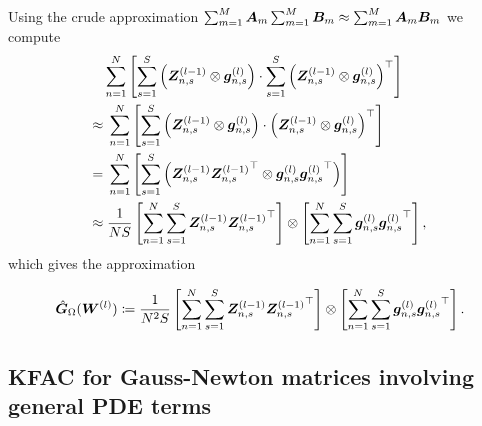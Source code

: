 Using the crude approximation $\sum_{m=1}^M {\bm{A}}_m\sum_{m=1}^M {\bm{B}}_m \approx \sum_{m=1}^M {\bm{A}}_m {\bm{B}}_m$ we compute
\begin{align*}
    & \sum_{n=1}^N
    \left[\sum_{s=1}^S \left( {\bm{Z}}^{(l-1)}_{n,s}\otimes {\bm{g}}_{n,s}^{(l)} \right)
    \cdot
    \sum_{s=1}^S \left( {\bm{Z}}
    ^{(l-1)}_{n,s}\otimes {\bm{g}}_{n,s}^{(l)} \right)^\top\right]
    \\ \approx & \;
    \sum_{n=1}^N
    \left[\sum_{s=1}^S \left( {\bm{Z}}^{(l-1)}_{n,s}\otimes {\bm{g}}_{n,s}^{(l)} \right)
    \cdot
    \left( {\bm{Z}}
    ^{(l-1)}_{n,s}\otimes {\bm{g}}_{n,s}^{(l)} \right)^\top\right]
    \\ = & \;
    \sum_{n=1}^N
    \left[\sum_{s=1}^S \left( {\bm{Z}}^{(l-1)}_{n,s}{{\bm{Z}}
    ^{(l-1)}_{n,s}}^\top\otimes {\bm{g}}_{n,s}^{(l)}{{\bm{g}}_{n,s}^{(l)}}^\top \right)
    \right]
    \\ \approx & \;
    \frac{1}{NS}\left[\sum_{n=1}^N \sum_{s=1}^S {\bm{Z}}^{(l-1)}_{n,s}{{\bm{Z}}^{(l-1)}_{n,s}}^\top \right]
    \otimes
    \left[\sum_{n=1}^N\sum_{s=1}^S {\bm{g}}^{(l)}_{n,s}{{\bm{g}}^{(l)}_{n,s}}^\top \right],
\end{align*}
which gives the approximation
\begin{tcolorbox}[colframe=kfac, title={KFAC for Gauss-Newton with the Laplace operator},bottom=0mm,top=0mm,middle=0mm]
\begin{align*}\label{eq:KFAC-PINN}
    \hat{\mG}_\Omega%
    (\mW^{(l)})
    \coloneqq \frac{1}{N^2S}
    \left[\sum_{n=1}^N \sum_{s=1}^S \mZ^{(l-1)}_{n,s}{\mZ^{(l-1)}_{n,s}}^\top \right]
    \otimes
    \left[\sum_{n=1}^N\sum_{s=1}^S \vg^{(l)}_{n,s}{\vg^{(l)}_{n,s}}^\top \right].
\end{align*}
\end{tcolorbox}

\subsection{KFAC for Gauss-Newton matrices involving general PDE terms}

